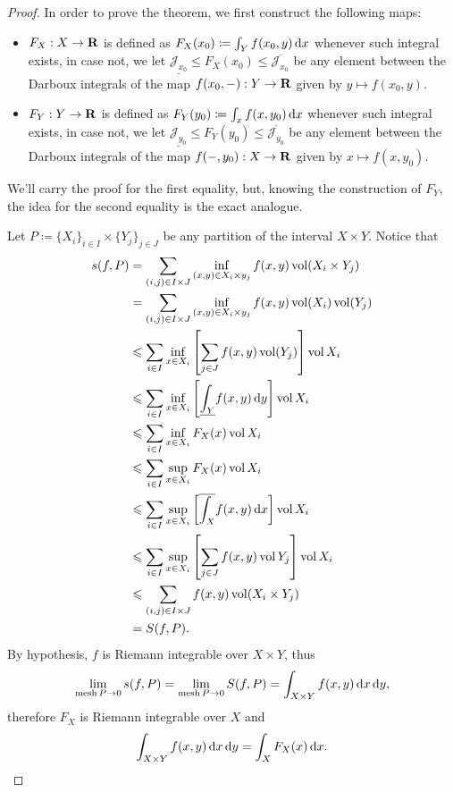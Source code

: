 \begin{proof}
In order to prove the theorem, we first construct the following maps:
\begin{itemize}\setlength\itemsep{0em}
\item \(F_X: X \to \mathbf{R}\) is defined as \(F_{X}(x_0) \coloneq \int_Y f(x_0, y)\,
  \mathrm{d} x\) whenever such integral exists, in case not, we let
  \(\underline{\mathcal{J}_{x_0}} \leq F_{X}(x_0) \leq
  \overline{\mathcal{J}_{x_0}}\) be any element between the Darboux integrals of
  the map \(f(x_{0}, -): Y \to \mathbf{R}\) given by \(y \mapsto f(x_{0}, y)\).

\item \(F_Y: Y \to \mathbf{R}\) is defined as \(F_{Y}(y_{0}) \coloneq \int_x f(x,
  y_{0})\, \mathrm{d} x\) whenever such integral exists, in case not, we let
  \(\underline{\mathcal{J}_{y_0}} \leq F_{Y}(y_{0}) \leq
  \overline{\mathcal{J}_{y_0}}\) be any element between the Darboux integrals of
  the map \(f(-, y_0): X \to \mathbf{R}\) given by \(x \mapsto f(x, y_{0})\).
\end{itemize}
We'll carry the proof for the first equality, but, knowing the construction of
\(F_Y\), the idea for the second equality is the exact analogue.

Let \(P \coloneq \{X_{i}\}_{i \in I} \times \{Y_{j}\}_{j \in J}\) be any
partition of the interval \(X \times Y\). Notice that
\begin{align*}
  s(f, P)
  &= \sum_{(i, j) \in I \times J}
    \inf_{(x, y) \in X_i \times y_j}f(x, y) \operatorname{vol}(X_i \times Y_j) \\
  &= \sum_{(i, j) \in I \times J}
    \inf_{(x, y) \in X_i \times y_j}f(x, y) \operatorname{vol}(X_i) \operatorname{vol}(Y_j) \\
  &\leqslant \sum_{i \in I}
    \inf_{x \in X_i} \left[ \sum_{j \in J} f(x, y) \operatorname{vol}(Y_j) \right] \operatorname{vol} X_i  \\
  &\leqslant \sum_{i \in I} \inf_{x \in X_i} \left[ \underline{\int_{Y}} f(x, y)\,
    \mathrm{d} y \right] \operatorname{vol} X_i \\
  &\leqslant \sum_{i \in I} \inf_{x \in X_i} F_X(x) \operatorname{vol} X_i \\
  &\leqslant \sum_{i \in I} \sup_{x \in X_i} F_X(x) \operatorname{vol} X_i \\
  &\leqslant \sum_{i \in I} \sup_{x \in X_i} \left[ \overline{\int_X} f(x, y)\, \mathrm{d}
  x \right] \operatorname{vol} X_i \\
  &\leqslant \sum_{i \in I} \sup_{x \in X_i} \left[ \sum_{j \in J} f(x, y) \operatorname{vol} Y_j
    \right] \operatorname{vol} X_i \\
  &\leqslant \sum_{(i, j) \in I \times J} f(x, y) \operatorname{vol}(X_i \times Y_j) \\
  &= S(f, P).
\end{align*}
By hypothesis, \(f\) is Riemann integrable over \(X \times Y\), thus
\[
  \lim_{\operatorname{mesh} P \to 0} s(f, P)
  = \lim_{\operatorname{mesh} P \to 0} S(f, P)
  = \int_{X \times Y} f(x, y)\, \mathrm{d} x\, \mathrm{d} y,
\]
therefore \(F_X\) is Riemann integrable over
\(X\) and
\[
  \int_{X \times Y} f(x, y)\, \mathrm{d} x\, \mathrm{d} y = \int_X F_X(x)\, \mathrm{d} x.
\]
\end{proof}


